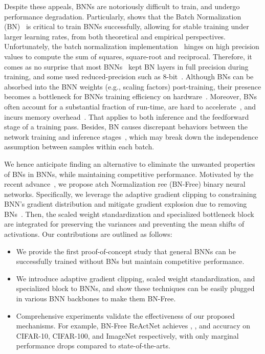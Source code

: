 \documentclass[final]{cvpr}
\begin{document}
Despite these appeals, BNNs are notoriously difficult to train, and undergo performance degradation. Particularly, \cite{santurkar2018does} shows that the Batch Normalization (BN)~\cite{ioffe2015batch} is critical to train BNNs successfully, allowing for stable training under larger learning rates, from both theoretical and empirical perspectives. Unfortunately, the batch normalization implementation~\cite{ioffe2015batch} hinges on high precision values to compute the sum of squares, square-root and reciprocal. Therefore, it comes as no surprise that most  BNNs~\cite{rastegari2016xnor,zhou2016dorefa,liu2018bi,liu2020reactnet} kept BN layers in full precision during training, and some used reduced-precision such as 8-bit~\cite{banner2018scalable}. Although BNs can be absorbed into the BNN weights (e.g., scaling factors) post-training, their presence becomes a bottleneck for BNNs training efficiency on hardware~\cite{wu2018l1}. Moreover, BNs often account for a substantial fraction of run-time, are hard to accelerate~\cite{gitman2017comparison}, and incurs memory overhead~\cite{bulo2018place}. That applies to both inference and the feedforward stage of a training pass. Besides, BN causes discrepant behaviors between the network training and inference stages~\cite{summers2019four}, which may break down the independence assumption between samples within each batch. 





We hence anticipate finding an alternative to eliminate the unwanted properties of BNs in BNNs, while maintaining competitive performance. Motivated by the recent advance~\cite{brock2021characterizing,brock2021agc}, we propose atch Normalization ree (BN-Free) binary neural networks. Specifically, we leverage the adaptive gradient clipping to constraining BNN's gradient distribution and mitigate gradient explosion due to removing BNs~\cite{santurkar2018does}. Then, the scaled weight standardization and specialized bottleneck block~\cite{brock2021agc} are integrated for preserving the variances and preventing the mean shifts of activations. Our contributions are outlined as follows:
\begin{itemize}
\item We provide the first proof-of-concept study that general BNNs can be successfully trained without BNs but maintain competitive performance. 
\item We introduce adaptive gradient clipping, scaled weight standardization, and specialized block to BNNs, and show these techniques can be easily plugged in various BNN backbones to make them BN-Free.
\item Comprehensive experiments validate the effectiveness of our proposed mechanisms. For example, BN-Free ReActNet achieves , , and  accuracy on CIFAR-10, CIFAR-100, and ImageNet respectively, with only marginal performance drops compared to state-of-the-arts.
\end{itemize}
\end{document}
